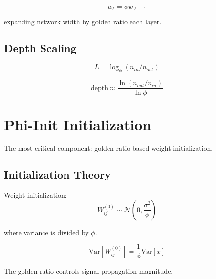 \begin{proposition}
\label{prop:golden-width}
\begin{equation}
w_\ell = \phi w_{\ell-1}
\end{equation}

expanding network width by golden ratio each layer.
\end{proposition}

\subsection{Depth Scaling}

\begin{equation}
L = \log_\phi(n_{in}/n_{out})
\end{equation}

\begin{theorem}
\label{thm:golden-depth}
\begin{equation}
\text{depth} \approx \frac{\ln(n_{out}/n_{in})}{\ln\phi}
\end{equation}

\end{theorem}

\section{Phi-Init Initialization}

The most critical component: golden ratio-based weight initialization.

\subsection{Initialization Theory}

\begin{definition}
\label{def:phi-init}
Weight initialization:
\begin{equation}
W_{ij}^{(0)} \sim \mathcal{N}\left(0, \frac{\sigma^2}{\phi}\right)
\end{equation}

where variance is divided by $\phi$.
\end{definition}

\begin{theorem}
\label{thm:variance-preserving}
\begin{equation}
\text{Var}[W_{ij}^{(0)}] = \frac{1}{\phi} \text{Var}[x]
\end{equation}

The golden ratio controls signal propagation magnitude.
\end{theorem}

